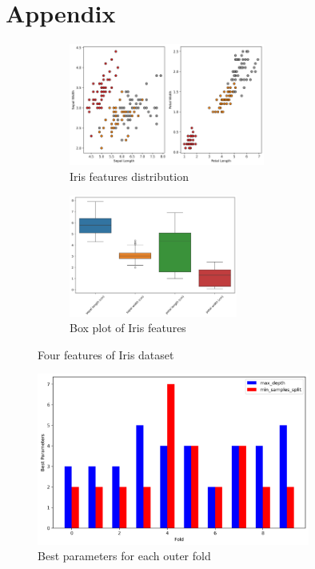 \documentclass[12pt,a4paper]{article}
\begin{document}
\section{Appendix}\label{sec:appendix}
\begin{figure}[h]
    \centering
    \begin{subfigure}{0.48\textwidth}
        \centering
        \includegraphics[width=\linewidth, height=4cm]{figures/iris_feature.png}
        \caption{Iris features distribution}
        \label{fig:iris_features_distribution}
    \end{subfigure}
    \hfill
    \begin{subfigure}{0.48\textwidth}
        \centering
        \includegraphics[width=\linewidth, height=4cm]{figures/iris_boxplot.png}
        \caption{Box plot of Iris features}
        \label{fig:iris_boxplot}
    \end{subfigure}
    \caption{Four features of Iris dataset}
    \label{fig:iris_features}
\end{figure}

\begin{figure}[h]
    \centering
    \includegraphics[width=0.8\textwidth]{figures/iris_best_parameters_for_each_fold.png}
    \caption{Best parameters for each outer fold}
    \label{fig:best_parameters}
\end{figure}
\end{document}
